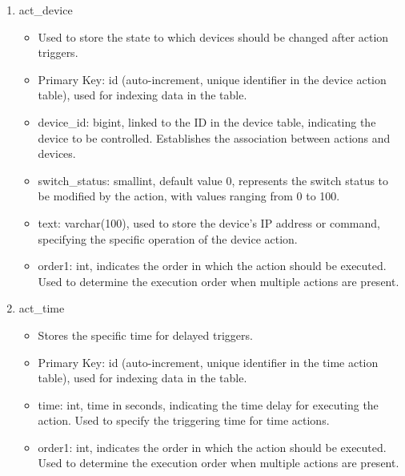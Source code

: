 \begin{enumerate}
\begin{enumerate}
              \item act\_device
                    \begin{itemize}
                        \item Used to store the state to which devices should be changed after action triggers.
                        \item Primary Key: id (auto-increment, unique identifier in the device action table), used for indexing data in the table.
                        \item device\_id: bigint, linked to the ID in the device table, indicating the device to be controlled. Establishes the association between actions and devices.
                        \item switch\_status: smallint, default value 0, represents the switch status to be modified by the action, with values ranging from 0 to 100.
                        \item text: varchar(100), used to store the device's IP address or command, specifying the specific operation of the device action.
                        \item order1: int, indicates the order in which the action should be executed. Used to determine the execution order when multiple actions are present.\\
                    \end{itemize}

              \item act\_time
                    \begin{itemize}
                        \item Stores the specific time for delayed triggers.
                        \item Primary Key: id (auto-increment, unique identifier in the time action table), used for indexing data in the table.
                        \item time: int, time in seconds, indicating the time delay for executing the action. Used to specify the triggering time for time actions.
                        \item order1: int, indicates the order in which the action should be executed. Used to determine the execution order when multiple actions are present.\\
                    \end{itemize}


\end{enumerate}
\end{enumerate}
